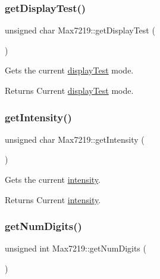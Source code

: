 \subsubsection{\texorpdfstring{get\+Display\+Test()}{getDisplayTest()}}
{\footnotesize\ttfamily unsigned char Max7219\+::get\+Display\+Test (\begin{DoxyParamCaption}{ }\end{DoxyParamCaption})}

Gets the current \hyperlink{classdrumpi_1_1Max7219_a203552d0f41ceb1366dbd8bbf1608110}{display\+Test} mode. \begin{DoxyReturn}{Returns}
Current \hyperlink{classdrumpi_1_1Max7219_a203552d0f41ceb1366dbd8bbf1608110}{display\+Test} mode. 
\end{DoxyReturn}
\mbox{\label{classdrumpi_1_1Max7219_a16035185e3439775135256e40ad638a9}} 
\subsubsection{\texorpdfstring{get\+Intensity()}{getIntensity()}}
{\footnotesize\ttfamily unsigned char Max7219\+::get\+Intensity (\begin{DoxyParamCaption}{ }\end{DoxyParamCaption})}

Gets the current \hyperlink{classdrumpi_1_1Max7219_a22aa789cc1ac84c6c5df7ad59607afed}{intensity}. \begin{DoxyReturn}{Returns}
Current \hyperlink{classdrumpi_1_1Max7219_a22aa789cc1ac84c6c5df7ad59607afed}{intensity}. 
\end{DoxyReturn}
\mbox{\label{classdrumpi_1_1Max7219_ab6bc447965dffdc63f050b2eda80cedd}} 
\subsubsection{\texorpdfstring{get\+Num\+Digits()}{getNumDigits()}}
{\footnotesize\ttfamily unsigned int Max7219\+::get\+Num\+Digits (\begin{DoxyParamCaption}{ }\end{DoxyParamCaption})}

